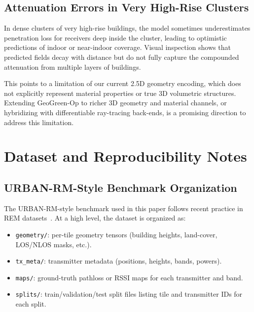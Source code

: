 \documentclass{article}
\begin{document}
\subsection{Attenuation Errors in Very High-Rise Clusters}

In dense clusters of very high-rise buildings, the model sometimes
underestimates penetration loss for receivers deep inside the
cluster, leading to optimistic predictions of indoor or
near-indoor coverage.
Visual inspection shows that predicted fields decay with distance
but do not fully capture the compounded attenuation from multiple
layers of buildings.

This points to a limitation of our current 2.5D geometry encoding,
which does not explicitly represent material properties or true
3D volumetric structures.
Extending GeoGreen-Op to richer 3D geometry and material channels,
or hybridizing with differentiable ray-tracing back-ends, is a
promising direction to address this limitation.



\section{Dataset and Reproducibility Notes}
\label{app:dataset_repro}

\subsection{URBAN-RM-Style Benchmark Organization}

The URBAN-RM-style benchmark used in this paper follows recent practice
in REM datasets~\cite{yapar2024radiomapchallenge,zhang2024spectrumnet}.
At a high level, the dataset is organized as:

\begin{itemize}[leftmargin=1.5em]
\item \texttt{geometry/}: per-tile geometry tensors
(building heights, land-cover, LOS/NLOS masks, etc.).
\item \texttt{tx\_meta/}: transmitter metadata
(positions, heights, bands, powers).
\item \texttt{maps/}: ground-truth pathloss or RSSI maps
for each transmitter and band.
\item \texttt{splits/}: train/validation/test split files
listing tile and transmitter IDs for each split.
\end{itemize}
\end{document}
